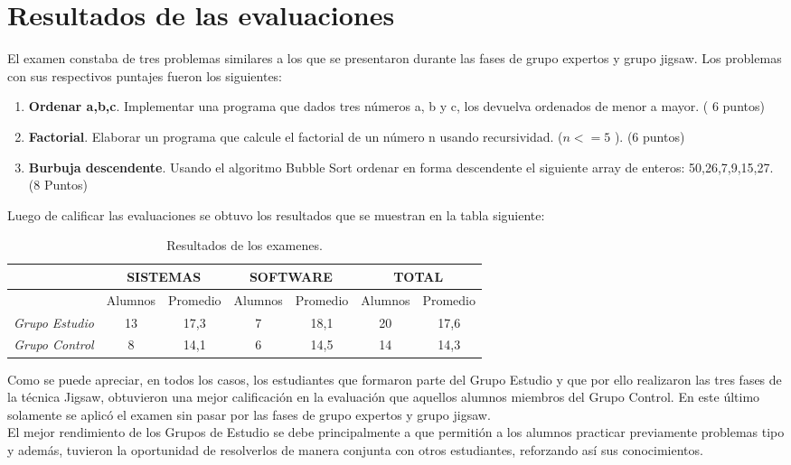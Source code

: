 \section{Resultados de las evaluaciones}

El examen constaba de tres problemas similares a los que se presentaron durante las fases de grupo expertos y grupo jigsaw. Los problemas con sus respectivos puntajes fueron los siguientes:

\begin{enumerate}
	\item \textbf{Ordenar a,b,c}. Implementar una programa que dados tres números a, b y c, los devuelva ordenados de menor a mayor. ( 6 puntos)
	\item \textbf{Factorial}. Elaborar un programa que calcule el factorial de un número n usando recursividad. ($n <= 5$ ). (6 puntos)
	\item \textbf{Burbuja descendente}. Usando el algoritmo Bubble Sort ordenar en forma descendente el siguiente array de enteros: 50,26,7,9,15,27. (8 Puntos)
\end{enumerate}

Luego de calificar las evaluaciones se obtuvo los resultados que se muestran en la tabla siguiente:\\


\begin{longtable}{|c|c|c|c|c|c|c|}
	\caption{Resultados de los examenes.}
	\label{tab:resultados_examenes}\\
	\toprule[0.7mm]
	& \multicolumn{2}{c|}{\textbf{SISTEMAS}} & \multicolumn{2}{c|}{\textbf{SOFTWARE}} & \multicolumn{2}{c|}{\textbf{TOTAL}}   \\ 
	\midrule
	& Alumnos & Promedio & Alumnos & Promedio & Alumnos & Promedio \\ 
	\midrule
	\emph{Grupo Estudio} & 13 & 17,3 & 7 & 18,1 & 20 & 17,6 \\ 
	\midrule
	\emph{Grupo Control }& 8 & 14,1 & 6 & 14,5 & 14 & 14,3 \\ 
	\bottomrule[0.7mm]
\end{longtable} 

Como se puede apreciar, en todos los casos, los estudiantes que formaron parte del Grupo Estudio y que por ello realizaron las tres fases de la técnica Jigsaw, obtuvieron una mejor calificación en la evaluación que aquellos alumnos miembros del Grupo Control. En este último solamente se aplicó el examen sin pasar por las fases de grupo expertos y grupo jigsaw.\\

El mejor rendimiento de los Grupos de Estudio se debe principalmente a que permitión a los alumnos practicar previamente problemas tipo y además, tuvieron la oportunidad de resolverlos de manera conjunta con otros estudiantes, reforzando así sus conocimientos.

